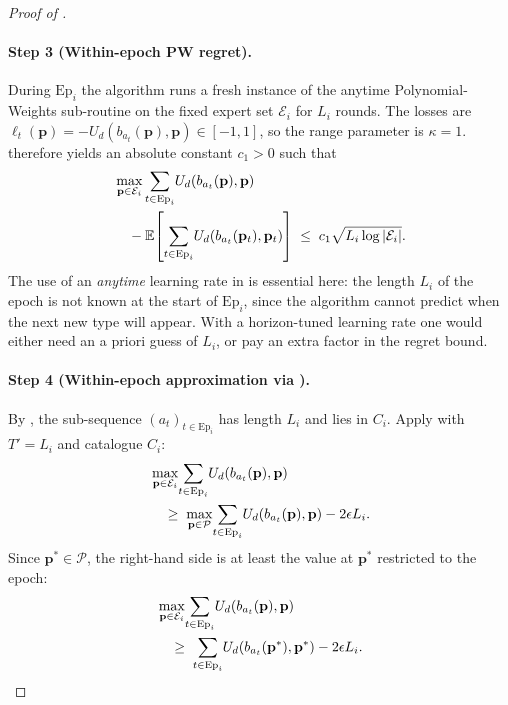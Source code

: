 \documentclass[letterpaper,9pt,twocolumn]{extarticle}
\newcommand{\pvec}{\mathbf{p}}
\newcommand{\cP}{\mathcal{P}}
\newcommand{\cE}{\mathcal{E}}
\newcommand{\EE}{\mathbb{E}}
\theoremstyle{plain}
\theoremstyle{definition}
\theoremstyle{remark}
\begin{document}
\begin{proof}[Proof of ]
\paragraph{Step 3 (Within-epoch PW regret).}
During $\mathrm{Ep}_i$ the algorithm runs a fresh instance of the anytime
Polynomial-Weights sub-routine on the fixed expert set $\cE_i$ for $L_i$
rounds. The losses are $\ell_t(\pvec)=-U_d(b_{a_t}(\pvec),\pvec)\in[-1,1]$,
so the range parameter is $\kappa=1$.  therefore
yields an absolute constant $c_1>0$ such that
\begin{align}
&\max_{\pvec\in\cE_i}\sum_{t\in\mathrm{Ep}_i}\!U_d(b_{a_t}(\pvec),\pvec)\notag\\
&\quad-\EE\!\left[\sum_{t\in\mathrm{Ep}_i}\!U_d(b_{a_t}(\pvec_t),\pvec_t)\right]\;\le\;c_1\sqrt{L_i\log|\cE_i|}.
\label{eq:hedge-epoch}
\end{align}
The use of an \emph{anytime} learning rate in  is essential
here: the length $L_i$ of the epoch is not known at the start of
$\mathrm{Ep}_i$, since the algorithm cannot predict when the next new type
will appear. With a horizon-tuned learning rate one would either need an
a priori guess of $L_i$, or pay an extra factor in the regret bound.

\paragraph{Step 4 (Within-epoch approximation via ).}
By , the sub-sequence
$(a_t)_{t\in\mathrm{Ep}_i}$ has length $L_i$ and lies in $C_i$. Apply
 with $T'=L_i$ and catalogue $C_i$:
\begin{align}
&\max_{\pvec\in\cE_i}\!\sum_{t\in\mathrm{Ep}_i}\!U_d(b_{a_t}(\pvec),\pvec)\notag\\
&\quad\ge\;\max_{\pvec\in\cP}\!\sum_{t\in\mathrm{Ep}_i}\!U_d(b_{a_t}(\pvec),\pvec)-2\epsilon L_i.
\label{eq:lem43-epoch}
\end{align}
Since $\pvec^{*}\in\cP$, the right-hand side is at least the value at
$\pvec^{*}$ restricted to the epoch:
\begin{align}
&\max_{\pvec\in\cE_i}\!\sum_{t\in\mathrm{Ep}_i}\!U_d(b_{a_t}(\pvec),\pvec)\notag\\
&\quad\ge\;\sum_{t\in\mathrm{Ep}_i}\!U_d(b_{a_t}(\pvec^{*}),\pvec^{*})-2\epsilon L_i.
\label{eq:lem43-pstar}
\end{align}


\end{proof}
\end{document}
